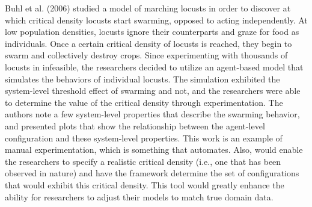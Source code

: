 Buhl et al. (2006)\nocite{buhl2006dom} studied a model of marching locusts in order to discover at which critical density locusts start swarming, opposed to acting independently.
At low population densities, locusts ignore their counterparts and graze for food as individuals.
Once a certain critical density of locusts is reached, they begin to swarm and collectively destroy crops.
Since experimenting with thousands of locusts in infeasible, the researchers decided to utilize an agent-based model that simulates the behaviors of individual locusts.
The simulation exhibited the system-level threshold effect of swarming and not, and the researchers were able to determine the value of the critical density through experimentation.
The authors note a few system-level properties that describe the swarming behavior, and presented plots that show the relationship between the agent-level configuration and these system-level properties.
This work is an example of manual experimentation, which is something that \fw automates.
Also, \fw would enable the researchers to specify a realistic critical density (i.e., one that has been observed in nature) and have the framework determine the set of configurations that would exhibit this critical density.
This tool would greatly enhance the ability for researchers to adjust their models to match true domain data.

